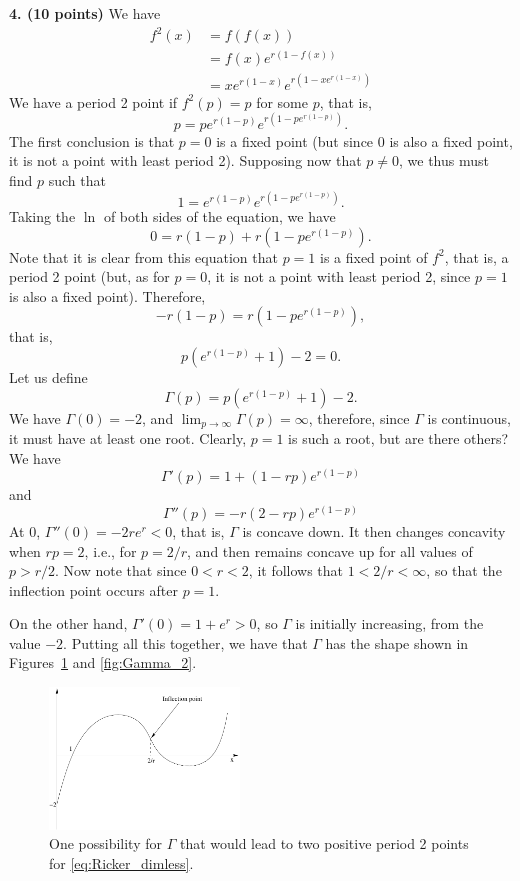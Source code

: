 \documentclass[12pt]{article}
\theoremstyle{plain}
\begin{document}
\vskip0.4cm
\noindent
{\bf 4. (10 points)} 
We have
\begin{align*}
f^2(x) &= f(f(x)) \\
&= f(x)e^{r(1-f(x))} \\
&= xe^{r(1-x)}e^{r(1-xe^{r(1-x)})}
\end{align*}
We have a period 2 point if $f^2(p)=p$ for some $p$, that is,
\[
p=pe^{r(1-p)}e^{r(1-pe^{r(1-p)})}.
\]
The first conclusion is that $p=0$ is a fixed point (but since 0 is also a fixed point, it is not a point with least period 2). Supposing now that $p\neq 0$, we thus must find $p$ such that
\[
1=e^{r(1-p)}e^{r(1-pe^{r(1-p)})}.
\]
Taking the $\ln$ of both sides of the equation, we have
\[
0=r(1-p)+r\left(1-pe^{r(1-p)}\right).
\]
Note that it is clear from this equation that $p=1$ is a fixed point of $f^2$, that is, a period 2 point (but, as for $p=0$, it is not a point with least period 2, since $p=1$ is also a fixed point).
Therefore, 
\[
-r(1-p)=r(1-pe^{r(1-p)}),
\]
that is,
\[
p\left(e^{r(1-p)}+1\right)-2=0.
\]
Let us define
\[
\Gamma(p)=p\left(e^{r(1-p)}+1\right)-2.
\]
We have $\Gamma(0)=-2$, and $\lim_{p\to\infty}\Gamma(p)=\infty$, therefore, since $\Gamma$ is continuous, it must have at least one root. Clearly, $p=1$ is such a root, but are there others?
We have
\[
\Gamma'(p)=1+(1-rp)e^{r(1-p)}
\]
and
\[
\Gamma''(p)=-r(2-rp)e^{r(1-p)}
\]
At $0$, $\Gamma''(0)=-2re^r<0$, that is, $\Gamma$ is concave down. It then changes concavity when $rp=2$, i.e., for $p=2/r$, and then remains concave up for all values of $p>r/2$. Now note that since $0<r<2$, it follows that $1<2/r<\infty$, so that the inflection point occurs after $p=1$.

On the other hand, $\Gamma'(0)=1+e^r>0$, so $\Gamma$ is initially increasing, from the value $-2$. Putting all this together, we have that $\Gamma$ has the shape shown in Figures~\ref{fig:Gamma_1} and \ref{fig:Gamma_2}.

\begin{figure}[htbp]
\begin{center}
\includegraphics[width=0.45\textwidth]{fig1_a}
\caption{One possibility for $\Gamma$ that would lead to two positive period 2 points for \eqref{eq:Ricker_dimless}.}
\label{fig:Gamma_1}
\end{center}
\end{figure}
\end{document}

